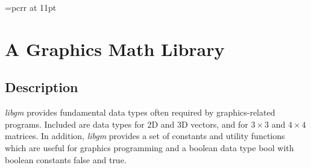 

\font\elevencour=pcrr at 11pt          %
\newcommand{\CO}[1]{{\elevencour#1}}   %
\newcommand{\co}[1]{{\eightcour#1}}    %

\author{Ferdi Scheepers and Stephen F. May\\
	Advanced Computing Center for the Arts and Design\\
	Department of Computer and Information Science\\
	The Ohio State University\\
	Columbus, Ohio, USA 
}


\newcommand{\napprox}{\approx\hspace{-0.9em}/\hspace{0.5em}}



\chapter{A Graphics Math Library}

\section*{Description}

{\it libgm\/} provides fundamental data types often required by 
graphics-related programs. Included are data types for 2D and 3D vectors,
and for $3\times3$ and $4\times4$ matrices. In addition, {\it libgm\/} 
provides a set of constants and utility functions which are useful for 
graphics programming and a boolean data type \CO{bool} with boolean constants
\CO{false} and \CO{true}.

